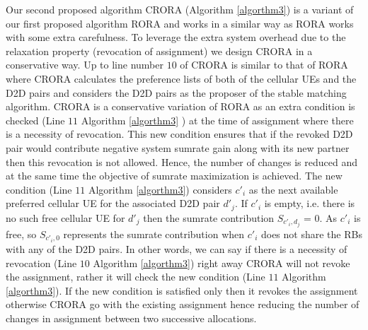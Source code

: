 \documentclass[times]{dacauth}
\begin{document}
\noindent
Our second proposed algorithm CRORA (Algorithm \ref{algorthm3}) is a variant of our first proposed algorithm RORA and works in a similar way as RORA works with some extra carefulness. To leverage the extra system overhead due to the relaxation property (revocation of assignment) we design CRORA in a conservative way. Up to line number $10$ of CRORA is similar to that of  RORA where CRORA calculates the preference lists of both of the cellular UEs and the D2D pairs and considers the D2D pairs as the proposer of the stable matching algorithm. CRORA is a conservative variation of RORA as an extra condition is checked (Line $11$   Algorithm \ref{algorthm3} ) at the time of assignment where there is a necessity of revocation. This new condition ensures that if the revoked D2D pair would contribute negative system sumrate gain along with its new partner then this revocation is not allowed. Hence, the number of changes is reduced and at the same time the objective of sumrate maximization is achieved. The new condition (Line $11$  Algorithm \ref{algorthm3}) considers $c'_i$ as the next available preferred cellular UE for the associated D2D pair $d'_j$. If $c'_i$ is empty, i.e. there is no such free cellular UE for $d'_j$ then the sumrate contribution $S_{c'_i,d_j}$ = 0. As $c'_i$ is free, so  $S_{c'_i,0}$ represents the sumrate contribution when $c'_i$ does not share the RBs with any of the D2D pairs. In other words, we can say if there is a necessity of revocation (Line $10$ Algorithm \ref{algorthm3}) right away CRORA will not revoke the assignment, rather it will check the new condition (Line $11$ Algorithm \ref{algorthm3}). If the new condition is satisfied only then it revokes the assignment otherwise CRORA go with the existing assignment hence reducing the number of changes in assignment between two successive allocations. 
 
\end{document}
